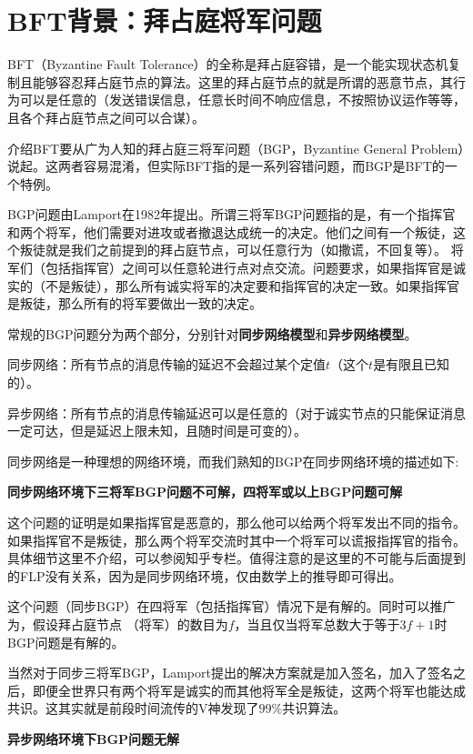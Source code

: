 \section{BFT背景：拜占庭将军问题}
BFT（Byzantine Fault Tolerance）的全称是拜占庭容错，是一个能实现状态机复制且能够容忍拜占庭节点的算法。这里的拜占庭节点的就是所谓的恶意节点，其行为可以是任意的（发送错误信息，任意长时间不响应信息，不按照协议运作等等，且各个拜占庭节点之间可以合谋）。

介绍BFT要从广为人知的拜占庭三将军问题（BGP，Byzantine General Problem）说起。这两者容易混淆，但实际BFT指的是一系列容错问题，而BGP是BFT的一个特例。

BGP问题由Lamport在1982年提出\cite{lamport1982byzantine}。所谓三将军BGP问题指的是，有一个指挥官和两个将军，他们需要对进攻或者撤退达成统一的决定。他们之间有一个叛徒，这个叛徒就是我们之前提到的拜占庭节点，可以任意行为（如撒谎，不回复等）。
将军们（包括指挥官）之间可以任意轮进行点对点交流。问题要求，如果指挥官是诚实的（不是叛徒），那么所有诚实将军的决定要和指挥官的决定一致。如果指挥官是叛徒，那么所有的将军要做出一致的决定。

常规的BGP问题分为两个部分，分别针对\textbf{同步网络模型}和\textbf{异步网络模型}。

同步网络：所有节点的消息传输的延迟不会超过某个定值$t$（这个$t$是有限且已知的）。

异步网络：所有节点的消息传输延迟可以是任意的（对于诚实节点的只能保证消息一定可达，但是延迟上限未知，且随时间是可变的）。

同步网络是一种理想的网络环境，而我们熟知的BGP在同步网络环境的描述如下:

\textbf{同步网络环境下三将军BGP问题不可解，四将军或以上BGP问题可解}

这个问题的证明是如果指挥官是恶意的，那么他可以给两个将军发出不同的指令。如果指挥官不是叛徒，那么两个将军交流时其中一个将军可以谎报指挥官的指令。具体细节这里不介绍，可以参阅知乎专栏\cite{zhihuBFT}。值得注意的是这里的不可能与后面提到的FLP没有关系，因为是同步网络环境，仅由数学上的推导即可得出。

这个问题（同步BGP）在四将军（包括指挥官）情况下是有解的。同时可以推广为，假设拜占庭节点 （将军）的数目为$f$，当且仅当将军总数大于等于$3f+1$时BGP问题是有解的。

当然对于同步三将军BGP，Lamport提出的解决方案就是加入签名\cite{lamport1979constructing}，加入了签名之后，即便全世界只有两个将军是诚实的而其他将军全是叛徒，这两个将军也能达成共识。这其实就是前段时间流传的V神发现了$99\%$共识算法。

\textbf{异步网络环境下BGP问题无解}

